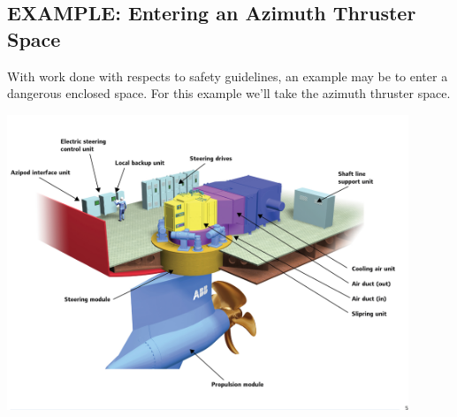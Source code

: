 \documentclass[11pt,a4paper]{article}
\begin{document}
\subsection{EXAMPLE: Entering an Azimuth Thruster Space}
With work done with respects to safety guidelines, an example may be to enter a dangerous enclosed space. For this example we'll take the azimuth thruster space.
\begin{center}
\includegraphics[width=12cm]{ABB}
\end{center}
\end{document}

